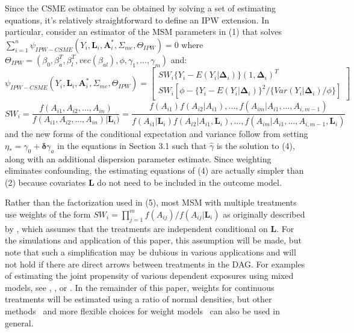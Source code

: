\documentclass[useAMS,usenatbib,referee]{biom}
\begin{document}
Since the CSME estimator can be obtained by solving a set of estimating equations, it's relatively straightforward to define an IPW extension. In particular, consider an estimator of the MSM parameters in (1) that solves $\sum_{i=1}^{n} \psi_{IPW-CSME}(Y_{i}, \bm{L}_{i}, \bm{A}^{*}_{i}, \Sigma_{me}, \Theta_{IPW}) = 0$ where $\Theta_{IPW} = (\beta_{0}, \beta^{T}_{a}, \beta^{T}_{l}, vec(\beta_{al}), \phi, \gamma_{1}, ..., \gamma_{m})$ and:
\begin{equation}
    \psi_{IPW-CSME}(Y_{i}, \bm{L}_{i}, \bm{A}^{*}_{i}, \Sigma_{me}, \Theta_{IPW}) =
    \begin{bmatrix}
       SW_{i} \{ Y_{i} - E(Y_{i} | \bm{\Delta}_{i}) \} (1, \bm{\Delta}_{i})^{T} \\
       SW_{i} \left [ \phi - \{ Y_{i} - E(Y_{i} | \bm{\Delta}_{i})\}^{2} / \{ Var(Y_{i} | \bm{\Delta}_{i}) / \phi \} \right ]
    \end{bmatrix}
\end{equation}
\begin{equation}
SW_{i} = \frac{f(A_{i1}, A_{i2}, ..., A_{in})}{f(A_{i1}, A_{i2}, ..., A_{in}) | \bm{L}_{i})} = \frac{f(A_{i1})f(A_{i2} | A_{i1}), ..., f(A_{im} | A_{i1}, ..., A_{i,m-1})}{f(A_{i1} | \bm{L}_{i})f(A_{i2} | A_{i1}, \bm{L}_{i}), ..., f(A_{im} | A_{i1}, ..., A_{i,m-1}, \bm{L}_{i})}
\end{equation}
and the new forms of the conditional expectation and variance follow from setting $\eta_{*} = \gamma_{0} + \bm{\delta}\gamma_{a}$ in the equations in Section 3.1 such that $\hat{\gamma}$ is the solution to (4), along with an additional dispersion parameter estimate. Since weighting eliminates confounding, the estimating equations of (4) are actually simpler than (2) because covariates $\bm{L}$ do not need to be included in the outcome model.

Rather than the factorization used in (5), most MSM with multiple treatments use weights of the form $SW_{i} = \prod_{j=1}^{m} f(A_{ij}) / f(A_{ij} | \bm{L}_{i})$ as originally described by \citet{hernan2001}, which assumes that the treatments are independent conditional on $\bm{L}$. For the simulations and application of this paper, this assumption will be made, but note that such a simplification may be dubious in various applications and will not hold if there are direct arrows between treatments in the DAG. For examples of estimating the joint propensity of various dependent exposures using mixed models, see \citet{tchetgen2012}, \citet{perez2014}, or \citet*{liu2016}. In the remainder of this paper, weights for continuous treatments will be estimated using a ratio of normal densities, but other methods~\citep{hirano2004} and more flexible choices for weight models~\citep{naimi2014} can also be used in general.
\end{document}
